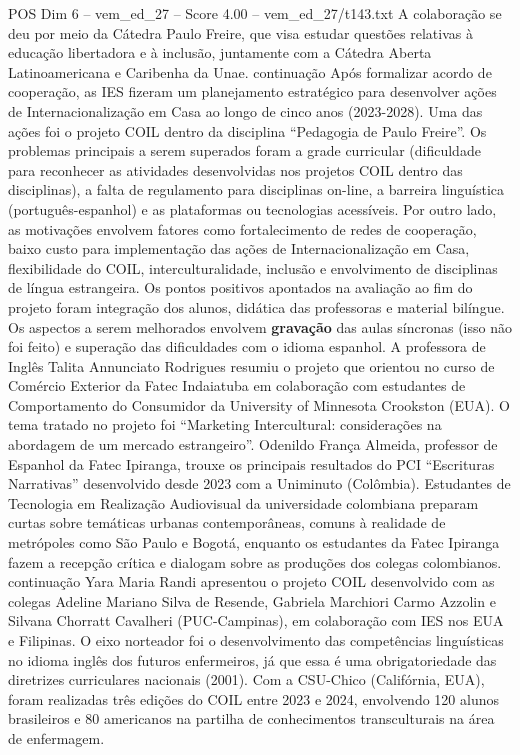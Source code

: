 \begin{textsample}{POS Dim 6 – vem\_ed\_27 – Score 4.00 – vem\_ed\_27/t143.txt}
A colaboração se deu por meio da Cátedra Paulo Freire, que visa estudar questões relativas à educação libertadora e à inclusão, juntamente com a Cátedra Aberta Latinoamericana e Caribenha da Unae. continuação Após formalizar acordo de cooperação, as IES fizeram um planejamento estratégico para desenvolver ações de Internacionalização em Casa ao longo de cinco anos (2023-2028).
Uma das ações foi o projeto COIL dentro da disciplina “Pedagogia de Paulo Freire”.
Os problemas principais a serem superados foram a grade curricular (dificuldade para reconhecer as atividades desenvolvidas nos projetos COIL dentro das disciplinas), a falta de regulamento para disciplinas on-line, a barreira linguística (português-espanhol) e as plataformas ou tecnologias acessíveis.
Por outro lado, as motivações envolvem fatores como fortalecimento de redes de cooperação, baixo custo para implementação das ações de Internacionalização em Casa, flexibilidade do COIL, interculturalidade, inclusão e envolvimento de disciplinas de língua estrangeira.
Os pontos positivos apontados na avaliação ao fim do projeto foram integração dos alunos, didática das professoras e material bilíngue.
Os aspectos a serem melhorados envolvem \textbf{gravação} das aulas síncronas (isso não foi feito) e superação das dificuldades com o idioma espanhol.
A professora de Inglês Talita Annunciato Rodrigues resumiu o projeto que orientou no curso de Comércio Exterior da Fatec Indaiatuba em colaboração com estudantes de Comportamento do Consumidor da University of Minnesota Crookston (EUA).
O tema tratado no projeto foi “Marketing Intercultural: considerações na abordagem de um mercado estrangeiro”.
Odenildo França Almeida, professor de Espanhol da Fatec Ipiranga, trouxe os principais resultados do PCI “Escrituras Narrativas” desenvolvido desde 2023 com a Uniminuto (Colômbia).
Estudantes de Tecnologia em Realização Audiovisual da universidade colombiana preparam curtas sobre temáticas urbanas contemporâneas, comuns à realidade de metrópoles como São Paulo e Bogotá, enquanto os estudantes da Fatec Ipiranga fazem a recepção crítica e dialogam sobre as produções dos colegas colombianos. continuação Yara Maria Randi apresentou o projeto COIL desenvolvido com as colegas Adeline Mariano Silva de Resende, Gabriela Marchiori Carmo Azzolin e Silvana Chorratt Cavalheri (PUC-Campinas), em colaboração com IES nos EUA e Filipinas.
O eixo norteador foi o desenvolvimento das competências linguísticas no idioma inglês dos futuros enfermeiros, já que essa é uma obrigatoriedade das diretrizes curriculares nacionais (2001).
Com a CSU-Chico (Califórnia, EUA), foram realizadas três edições do COIL entre 2023 e 2024, envolvendo 120 alunos brasileiros e 80 americanos na partilha de conhecimentos transculturais na área de enfermagem.

\end{textsample}
